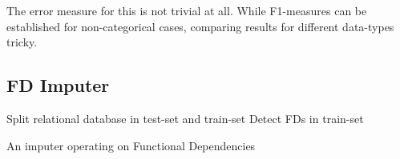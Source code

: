 The error measure for this is not trivial at all. While F1-measures can be established for non-categorical cases, comparing results for different data-types tricky.

\subsection{FD Imputer}


\begin{algorithm}[H]
    \DontPrintSemicolon
    \SetAlgoLined
    \BlankLine

    Split relational database in test-set and train-set\;
    Detect FDs in train-set\;
    \caption{An imputer operating on Functional Dependencies}
\end{algorithm}
